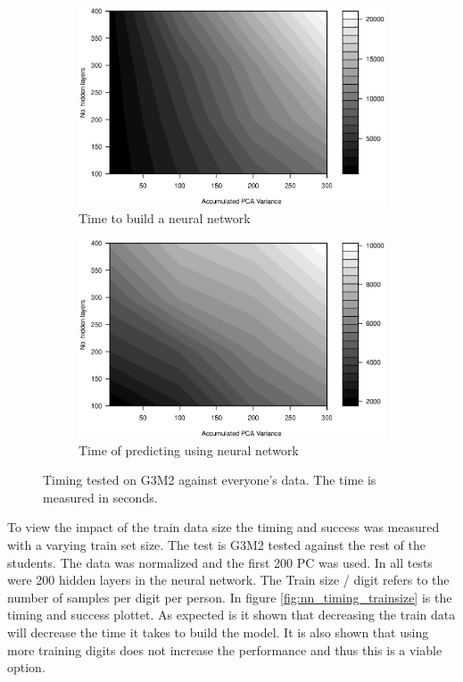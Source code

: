 \begin{figure}[h]
    \begin{subfigure}{0.49\textwidth}
    \centering
        \includegraphics[width=\textwidth]{graphics/contour_nn_size_vs_pca_model}
        \caption{Time to build a neural network}
        \label{fig:contour_nn_size_vs_pca_time_model}
    \end{subfigure}
    \begin{subfigure}{0.49\textwidth}
        \includegraphics[width=\textwidth]{graphics/contour_nn_size_vs_pca_predict}
        \caption{Time of predicting using neural network}
        \label{fig:contour_nn_size_vs_pca_time_predict}
    \end{subfigure}
    \caption{Timing tested on G3M2 against everyone's data. The time is measured in seconds.}
    \label{fig:contour_nn_both}
\end{figure}

To view the impact of the train data size the timing and success was measured with a varying train set size.
The test is G3M2 tested against the rest of the students.
The data was normalized and the first 200 PC was used.
In all tests were 200 hidden layers in the neural network.
The Train size / digit refers to the number of samples per digit per person.
In figure \ref{fig:nn_timing_trainsize} is the timing and success plottet.
As expected is it shown that decreasing the train data will decrease the time it takes to build the model.
It is also shown that using more training digits does not increase the performance and thus this is a viable option.

